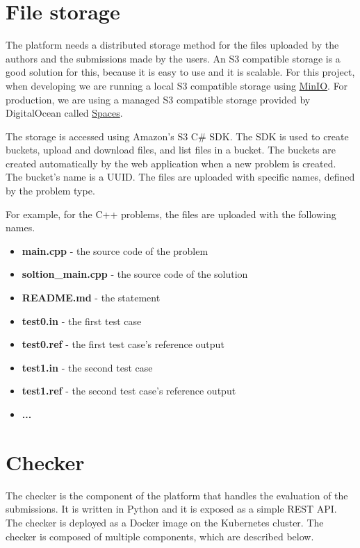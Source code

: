 \documentclass[12pt,a4paper]{report}
\begin{document}
\section{File storage}
The platform needs a distributed storage method for the files uploaded by the authors and the submissions made by the users. An S3 compatible storage is a good solution for this, because it is easy to use and it is scalable. For this project, when developing we are running a local S3 compatible storage using \href{https://min.io/}{MinIO}. For production, we are using a managed S3 compatible storage provided by DigitalOcean called \href{https://www.digitalocean.com/products/spaces/}{Spaces}.

The storage is accessed using Amazon's S3 C\# SDK. The SDK is used to create buckets, upload and download files, and list files in a bucket. The buckets are created automatically by the web application when a new problem is created. The bucket's name is a UUID. The files are uploaded with specific names, defined by the problem type.

\newpage
For example, for the C++ problems, the files are uploaded with the following names.

\begin{itemize}
	\item \textbf{main.cpp} - the source code of the problem
	\item \textbf{soltion\_main.cpp} - the source code of the solution
	\item \textbf{README.md} - the statement
	\item \textbf{test0.in} - the first test case
	\item \textbf{test0.ref} - the first test case's reference output
	\item \textbf{test1.in} - the second test case
	\item \textbf{test1.ref} - the second test case's reference output
	\item \textbf{...}
\end{itemize}

\section{Checker}
The checker is the component of the platform that handles the evaluation of the submissions. It is written in Python and it is exposed as a simple REST API. The checker is deployed as a Docker image on the Kubernetes cluster. The checker is composed of multiple components, which are described below.
\end{document}
